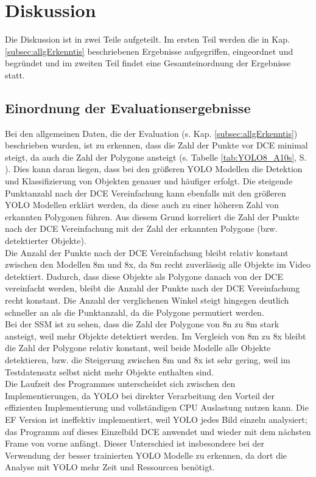 \chapter{Diskussion}
\label{ch:Diskussion}
{ 	
	Die Diskussion ist in zwei Teile aufgeteilt. Im ersten Teil werden die in Kap. \ref{subsec:allgErkenntis} beschriebenen Ergebnisse aufgegriffen, eingeordnet und begründet und im zweiten Teil findet eine Gesamteinordnung der Ergebnisse statt.

	\section{Einordnung der Evaluationsergebnisse}
	{
		Bei den allgemeinen Daten, die der Evaluation (s. Kap. \ref{subsec:allgErkenntis}) beschrieben wurden, ist zu erkennen, dass die Zahl der Punkte vor DCE minimal steigt, da auch die Zahl der Polygone ansteigt (s. Tabelle \ref{tab:YOLO8_A10s}, S. \pageref{tab:YOLO8_A10s}). Dies kann daran liegen, dass bei den größeren YOLO Modellen die Detektion und Klassifizierung von Objekten genauer und häufiger erfolgt. Die steigende Punktanzahl nach der DCE Vereinfachung kann ebenfalls mit den größeren YOLO Modellen erklärt werden, da diese auch zu einer höheren Zahl von erkannten Polygonen führen. Aus diesem Grund korreliert die Zahl der Punkte nach der DCE Vereinfachung mit der Zahl der erkannten Polygone (bzw. detektierter Objekte).\\
		Die Anzahl der Punkte nach der DCE Vereinfachung bleibt relativ konstant zwischen den Modellen 8m und 8x, da 8m recht zuverlässig alle Objekte im Video detektiert. Dadurch, dass diese Objekte als Polygone danach von der DCE vereinfacht werden, bleibt die Anzahl der Punkte nach der DCE Vereinfachung recht konstant. Die Anzahl der verglichenen Winkel steigt hingegen deutlich schneller an als die Punktanzahl, da die Polygone permutiert werden. \\
		Bei der SSM ist zu sehen, dass die Zahl der Polygone von 8n zu 8m stark ansteigt, weil mehr Objekte detektiert werden. Im Vergleich von 8m zu 8x bleibt die Zahl der Polygone relativ  konstant, weil beide Modelle alle Objekte detektieren, bzw. die Steigerung zwischen 8m und 8x ist sehr gering, weil im Testdatensatz selbst nicht mehr Objekte enthalten sind. \\
		Die Laufzeit des Programmes unterscheidet sich zwischen den Implementierungen, da YOLO bei direkter Verarbeitung den Vorteil der effizienten Implementierung und vollständigen CPU Auslastung nutzen kann. Die EF Version ist ineffektiv implementiert, weil YOLO jedes Bild einzeln analysiert; das Programm auf dieses Einzelbild DCE anwendet und wieder mit dem nächsten Frame von vorne anfängt. Dieser Unterschied ist insbesondere bei der Verwendung der besser trainierten YOLO Modelle zu erkennen, da dort die Analyse mit YOLO mehr Zeit und Ressourcen benötigt. \\
}}

